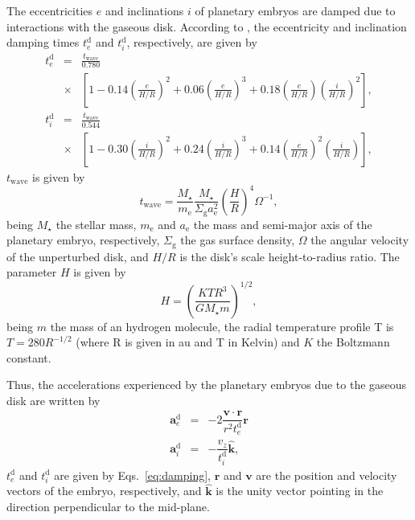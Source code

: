 \documentclass{aa}
\begin{document}
The eccentricities $e$ and inclinations $i$ of planetary embryos are damped due to interactions with the gaseous disk. According to \citet{Cresswell2008}, the eccentricity and inclination damping times $t^{\text{d}}_e$ and $t^{\text{d}}_i$, respectively,
are given by
\begin{equation}
\begin{array}{ccl}
t^{\text{d}}_e &=& \frac{t_{\text{wave}}}{\text{0.780}} \\ 
               &\times& \left[1-\text{0.14}\left(\frac{e}{H/R}\right)^{2}+\text{0.06}\left(\frac{e}{H/R}\right)^{3} +\text{0.18}\left(\frac{e}{H/R}\right)\left(\frac{i}{H/R}\right)^{2}\right], \\
t^{\text{d}}_i &=& \frac{t_{\text{wave}}}{\text{0.544}} \\
               &\times& \left[1-\text{0.30}\left(\frac{i}{H/R}\right)^{2}+\text{0.24}\left(\frac{i}{H/R}\right)^{3} +\text{0.14}\left(\frac{e}{H/R}\right)^{2}\left(\frac{i}{H/R}\right)\right], 
\label{eq:damping}
\end{array}
\end{equation}
 $t_{\text{wave}}$ is given by
\begin{equation}                                                                                                                                                            
 t_{\text{wave}} = \frac{M_\star}{m_{\text{e}}} \frac{M_\star}{\Sigma_{\text{g}} a^2_{\text{e}}} \left(\frac{H}{R}\right)^4 \Omega^{-1},                         
\end{equation} 
\noindent                                                                                                                                                                   
being $M_\star$ the stellar mass, $m_{\text{e}}$ and $a_{\text{e}}$ the mass and semi-major axis of the planetary embryo, respectively,
$\Sigma_{\text{g}}$ the gas surface density, $\Omega$ the angular velocity of the unperturbed disk, and $H/R$ is the disk's scale
height-to-radius ratio. The parameter $H$ is given by
\begin{equation}
 H = \left(\frac{K T R^3}{GM_\star m}\right)^{1/2},
 \label{eq:H}
\end{equation}
\noindent
being $m$ the mass of an hydrogen molecule, the radial temperature profile T is $T=280R^{-1/2}$ %
(where R is given in au and T in Kelvin) and $K$ the Boltzmann constant.

Thus, the accelerations experienced by the planetary embryos due to the gaseous disk are written by
\begin{equation}
 \begin{array}{lll}
 \mathbf{a}^{\text{d}}_e &=& -2 \dfrac{\mathbf{v}\cdot\mathbf{r}}{r^2 t^{\text{d}}_e} \mathbf{r} \\
 \mathbf{a}^{\text{d}}_i &=& -\dfrac{v_z}{t^{\text{d}}_i} \mathbf{\hat{k}},
 \end{array}
\end{equation}
 $t^{\text{d}}_e$ and $t^{\text{d}}_i$ are given by Eqs.~\eqref{eq:damping}, $\mathbf{r}$ and $\mathbf{v}$ are the position and velocity vectors
of the embryo, respectively, and $\mathbf{\hat{k}}$ is the unity vector pointing in the direction perpendicular to the mid-plane.
\end{document}
